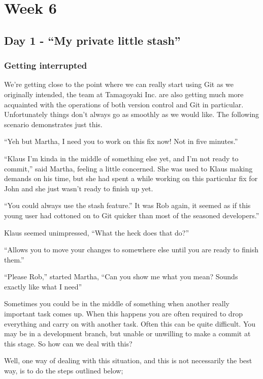 \cleardoublepage
\chapter{Week 6}
\section{Day 1 - ``My private little stash''}
\subsection{Getting interrupted}
We're getting close to the point where we can really start using Git as we originally intended, the team at Tamagoyaki Inc.
are also getting much more acquainted with the operations of both version control and Git in particular.
Unfortunately things don't always go as smoothly as we would like.
The following scenario demonstrates just this.

\begin{trenches}
``Yeh but Martha, I need you to work on this fix now! Not in five minutes.''

``Klaus I'm kinda in the middle of something else yet, and I'm not ready to commit,'' said Martha, feeling a little concerned.
She was used to Klaus making demands on his time, but she had spent a while working on this particular fix for John and she just wasn't ready to finish up yet.

``You could always use the stash feature.''
It was Rob again, it seemed as if this young user had cottoned on to Git quicker than most of the seasoned developers.''

Klaus seemed unimpressed, ``What the heck does that do?''

``Allows you to move your changes to somewhere else until you are ready to finish them.''

``Please Rob,'' started Martha,
``Can you show me what you mean? Sounds exactly like what I need''
\end{trenches}

Sometimes you could be in the middle of something when another really important task comes up.
When this happens you are often required to drop everything and carry on with another task.
Often this can be quite difficult.
You may be in a development branch, but unable or unwilling to make a commit at this stage.
So how can we deal with this?

Well, one way of dealing with this situation, and this is not necessarily the best way, is to do the steps outlined below;

